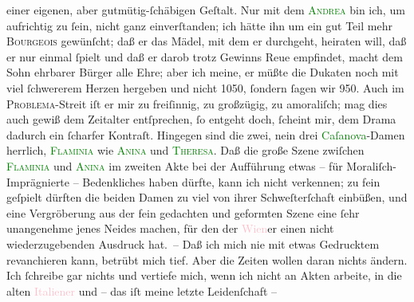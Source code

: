                     einer eigenen, aber gutmütig-ſchäbigen Geſtalt. Nur mit dem \textcolor{green}{\textsc{Andrea}}{} bin ich, um aufrichtig zu ſein, nicht
                    ganz einverſtanden; ich hätte ihn um ein gut Teil mehr \textsc{Bourgeois} gewünſcht; daß er das Mädel, mit dem er durchgeht, heiraten
                    will, daß er nur einmal ſpielt und daß er darob trotz Gewinns Reue empfindet,
                    macht dem Sohn ehrbarer Bürger alle Ehre; aber ich meine, er müßte die Dukaten
                    noch mit viel ſchwererem Herzen hergeben und nicht 1050, ſondern ſagen wir 950.
                    Auch im \textsc{Problema}-Streit iſt er mir zu freiſinnig, zu
                    großzügig, zu amoraliſch; mag dies auch gewiß dem Zeitalter entſprechen, ſo
                    entgeht doch, ſcheint mir, dem Drama dadurch ein ſcharfer Kontraſt. Hingegen
                    sind die zwei, nein drei \textcolor{green}{Caſanova}{}-Damen herrlich, \textcolor{green}{\textsc{Flaminia}}{} wie \textcolor{green}{\textsc{Anina}}{} und \textcolor{green}{\textsc{Theresa}}{}. Daß die große Szene zwiſchen \textcolor{green}{\textsc{Flaminia}}{} und \textcolor{green}{\textsc{Anina}}{} im zweiten Akte bei der Aufführung
                    etwas – für Moraliſch-Imprägnierte – Bedenk{\pb}liches haben dürfte, kann ich nicht
                    verkennen; zu fein geſpielt dürften die beiden Damen zu viel von ihrer
                    Schweſterſchaft einbüßen, und eine Vergröberung aus der fein gedachten und
                    geformten Szene eine ſehr unangenehme jenes Neides machen, für den der \textcolor{pink}{Wien}{}\ledrightnote{\textcolor{pink}{Wien}}er einen nicht wiederzugebenden Ausdruck
                    hat. –\pend
           \pstart
           Daß ich mich nie mit etwas Gedrucktem revanchieren kann, betrübt mich tief. Aber
                    die Zeiten wollen daran nichts ändern. Ich ſchreibe gar nichts und vertiefe
                    mich, wenn ich nicht an Akten arbeite, in die alten \textcolor{pink}{Italiener}{}\ledrightnote{\textcolor{pink}{Italien}} und – das iſt meine letzte Leidenſchaft –
